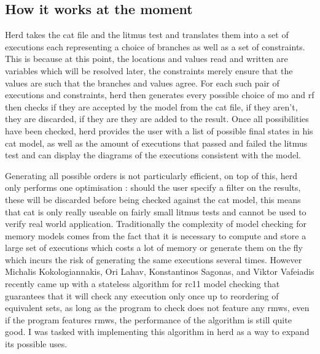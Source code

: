 \documentclass[a4,12pt]{article}
\begin{document}
\subsection{How it works at the moment}

Herd takes the cat file and the litmus test and translates them into a set of executions each representing a choice of branches as well as a set of constraints. This is because at this point, the locations and values read and written are variables which will be resolved later, the constraints merely ensure that the values are such that the branches and values agree. For each such pair of executions and constraints, herd then generates every possible choice of mo and rf then checks if they are accepted by the model from the cat file, if they aren't, they are discarded, if they are they are added to the result. Once all possibilities have been checked, herd provides the user with a list of possible final states in his cat model, as well as the amount of executions that passed and failed the litmus test and can display the diagrams of the executions consistent with the model.


Generating all possible orders is not particularly efficient, on top of this, herd only performs one optimisation : should the user specify a filter on the results, these will be discarded before being checked against the cat model, this means that cat is only really useable on fairly small litmus tests and cannot be used to verify real world application. Traditionally the complexity of model checking for memory models comes from the fact that it is necessary to compute and store a large set of executions which costs a lot of memory or generate them on the fly which incurs the risk of generating the same executions several times. However Michalis Kokologiannakis, Ori Lahav, Konstantinos Sagonas, and Viktor Vafeiadis recently came up with a stateless algorithm for rc11 model checking that guarantees that it will check any execution only once up to reordering of equivalent sets, as long as the program to check does not feature any rmws, even if the program features rmws, the performance of the algorithm is still quite good. I was tasked with implementing this algorithm in herd as a way to expand its possible uses.
\end{document}
